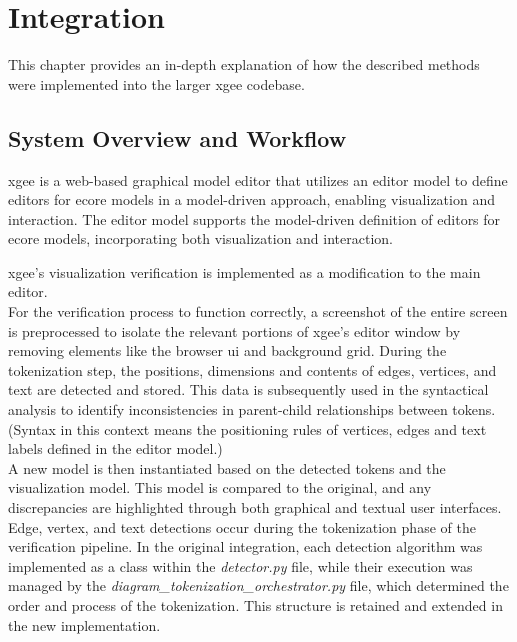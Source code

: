 \chapter{Integration}
\label{chap:Integration}
This chapter provides an in-depth explanation of how the described methods were implemented into the larger \acrshort{xgee} codebase.

\section{System Overview and Workflow}
\label{sec:system_overview}

\acrshort{xgee} is a web-based graphical model editor that utilizes an editor model to define editors for ecore models in a model-driven approach, enabling visualization and interaction. The editor model supports the model-driven definition of editors for ecore models, incorporating both visualization and interaction. \cite{waldvogel_annighoefer_models_2024}

\acrshort{xgee}'s visualization verification is implemented as a modification to the main editor.\\
For the verification process to function correctly, a screenshot of the entire screen is preprocessed to isolate the relevant portions of \acrshort{xgee}'s editor window by removing elements like the browser \acrshort{ui} and background grid. During the tokenization step, the positions, dimensions and contents of edges, vertices, and text are detected and stored. This data is subsequently used in the syntactical analysis to identify inconsistencies in parent-child relationships between tokens. (Syntax in this context means the positioning rules of vertices, edges and text labels defined in the editor model.)\\
A new model is then instantiated based on the detected tokens and the visualization model. This model is compared to the original, and any discrepancies are highlighted through both graphical and textual user interfaces.\\
Edge, vertex, and text detections occur during the tokenization phase of the verification pipeline. In the original integration, each detection algorithm was implemented as a class within the \textit{detector.py} file, while their execution was managed by the \textit{diagram\_tokenization\_orchestrator.py} file, which determined the order and process of the tokenization. This structure is retained and extended in the new implementation.


